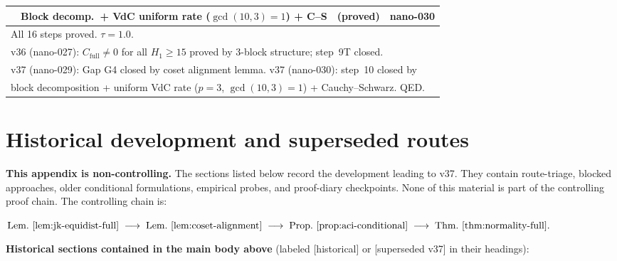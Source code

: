 \documentclass[
]{article}
\begin{document}
\begin{center}
\begin{tabular}{clll}
   & \quad Block decomp.\ + VdC uniform rate ($\gcd(10,3){=}1$) + C--S & (proved) & nano-030 \\
\midrule
\multicolumn{4}{l}{All 16 steps proved. $\tau=1.0$.} \\
\multicolumn{4}{l}{v36 (nano-027): $C_{\mathrm{full}}\ne 0$ for all $H_1\ge 15$ proved by 3-block structure; step~9T closed.}\\
\multicolumn{4}{l}{v37 (nano-029): Gap G4 closed by coset alignment lemma. v37 (nano-030): step~10 closed by}\\
\multicolumn{4}{l}{\quad block decomposition + uniform VdC rate ($p{=}3$, $\gcd(10,3){=}1$) + Cauchy--Schwarz. QED.}\\
\bottomrule
\end{tabular}
\end{center}

\appendix
\section{Historical development and superseded routes}
\label{app:historical}

\noindent\textbf{This appendix is non-controlling.}
The sections listed below record the development leading to v37.
They contain route-triage, blocked approaches, older conditional
formulations, empirical probes, and proof-diary checkpoints.
None of this material is part of the controlling proof chain.
The controlling chain is:

\medskip\noindent
$\text{Lem.~\ref{lem:jk-equidist-full}}
\;\longrightarrow\;
\text{Lem.~\ref{lem:coset-alignment}}
\;\longrightarrow\;
\text{Prop.~\ref{prop:aci-conditional}}
\;\longrightarrow\;
\text{Thm.~\ref{thm:normality-full}}.$

\medskip\noindent
\textbf{Historical sections contained in the main body above}
(labeled [historical] or [superseded v37] in their headings):
\end{document}
